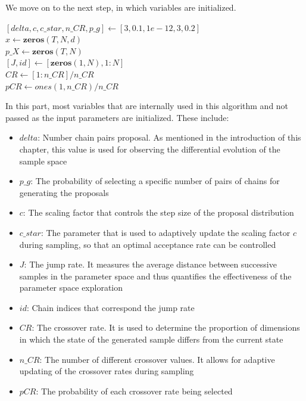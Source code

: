 We move on to the next step, in which variables are initialized.\\

\begin{algorithm}[H]
$[delta, c, c\_star, n\_CR, p\_g] \gets [3, 0.1, 1e-12, 3, 0.2]$\\
$x \gets \textbf{zeros}(T, N, d)$\\
$p\_X \gets \textbf{zeros}(T, N)$\\
$[J, id] \gets [\textbf{zeros}(1, N), 1:N]$\\
$CR \gets [1:n\_CR] / n\_CR$\\
$pCR \gets ones(1, n\_CR) / n\_CR$\\
\end{algorithm}

In this part, most variables that are internally used in this algorithm and not passed as the input parameters are initialized. These include:
\begin{itemize}
    \item $delta$: Number chain pairs proposal. As mentioned in the introduction of this chapter, this value is used for observing the differential evolution of the sample space
    \item $p\_g$: The probability of selecting a specific number of pairs of chains for generating the proposals
    \item $c$: The scaling factor that controls the step size of the proposal distribution
    \item $c\_star$: The parameter that is used to adaptively update the scaling factor $c$ during sampling, so that an optimal acceptance rate can be controlled
    \item $J$: The jump rate. It measures the average distance between successive samples in the parameter space and thus quantifies the effectiveness of the parameter space exploration
    \item $id$: Chain indices that correspond the jump rate
    \item $CR$: The crossover rate. It is used to determine the proportion of dimensions in which the state of the generated sample differs from the current state
    \item $n\_CR$: The number of different crossover values. It allows for adaptive updating of the crossover rates during sampling
    \item $pCR$: The probability of each crossover rate being selected
\end{itemize}

